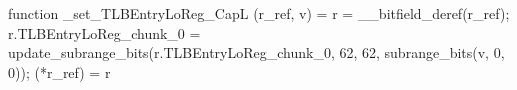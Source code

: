 function _set_TLBEntryLoReg_CapL (r_ref, v) = {
    r = __bitfield_deref(r_ref);
    r.TLBEntryLoReg_chunk_0 = update_subrange_bits(r.TLBEntryLoReg_chunk_0, 62, 62, subrange_bits(v, 0, 0));
    (*r_ref) = r
}
